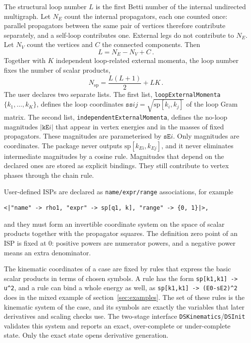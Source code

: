 \documentclass[11pt,a4paper]{article}
\begin{document}
The structural loop number $L$ is the first Betti number of the internal undirected multigraph.
Let $N_E$ count the internal propagators, each one counted once: parallel propagators between the
same pair of vertices therefore contribute separately, and a self-loop contributes one.
External legs do not contribute to $N_E$. Let $N_V$ count the vertices and $C$
the connected components. Then
\begin{equation}
L=N_E-N_V+C\,.
\label{eq:loopnumber}
\end{equation}
Together with $K$ independent
loop-related external momenta, the loop number fixes the number of scalar products,
\begin{equation}
N_{\mathrm{sp}}=\frac{L(L+1)}{2}+LK\,.
\label{eq:nsp}
\end{equation}
The user
declares two separate lists. The first list, \texttt{loopExternalMomenta} $\{k_1,\dots,k_K\}$,
defines the loop coordinates $\texttt{ss}ij=\sqrt{\mathrm{sp}[k_i,k_j]}$ of the loop Gram matrix.
The second list, \texttt{independentExternalMomenta}, defines the no-loop magnitudes
$|\texttt{kE}i|$ that appear in vertex energies and in the masses of fixed propagators. These
magnitudes are
parameterised by $\texttt{sE}i$. Only
magnitudes are coordinates. The package never outputs $\mathrm{sp}[k_{Ei},k_{Ej}]$, and it never
eliminates intermediate magnitudes by a cosine rule. Magnitudes that depend on the declared ones
are stored as explicit bindings. They still contribute to vertex phases through the chain rule.

User-defined ISPs are declared as \texttt{name/expr/range} associations, for example
\begin{verbatim}
<|"name" -> rho1, "expr" -> sp[q1, k], "range" -> {0, 1}|>,
\end{verbatim}
and they must form an invertible coordinate system on the space of scalar products together with
the propagator squares. The definition zero point of an ISP is fixed at $0$: positive powers are
numerator powers, and a negative power means an extra denominator.

The kinematic coordinates of a case are fixed by rules that express the basic scalar products in
terms of chosen symbols. A rule has the form
\texttt{sp[k1,k1] -> u\textasciicircum2}, and a rule can bind a whole energy as well, as
\texttt{sp[k1,k1] -> (E0-sE2)\textasciicircum2} does in the mixed example of
section~\ref{sec:examples}. The set of these rules is the kinematic system of the case, and its
symbols are exactly the variables that later derivatives and scaling checks use. The two-stage
interface \texttt{DSKinematics}/\texttt{DSInit}
validates this system and reports an exact, over-complete or under-complete
state. Only the exact state opens derivative generation.
\end{document}
